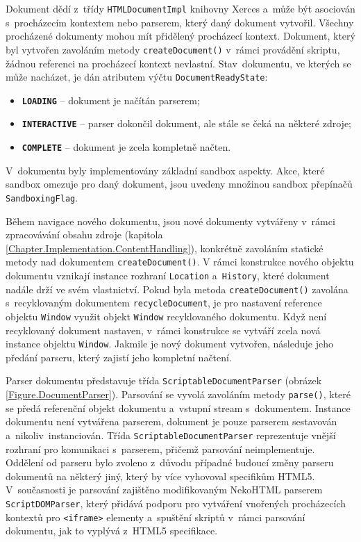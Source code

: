 Dokument dědí z~třídy \texttt{HTMLDocumentImpl} knihovny Xerces a~může být asociován s~procházecím kontextem nebo parserem, který daný dokument vytvořil. Všechny procházené dokumenty mohou mít přidělený procházecí kontext. Dokument, který byl vytvořen zavoláním metody \texttt{createDocument()} v~rámci provádění skriptu, žádnou referenci na procházecí kontext nevlastní. Stav~dokumentu, ve kterých se může nacházet, je dán atributem výčtu \texttt{DocumentReadyState}:

\begin{itemize}
  \item \textbf{\texttt{LOADING}} -- dokument je načítán parserem;
  \item \textbf{\texttt{INTERACTIVE}} -- parser dokončil dokument, ale stále se čeká na některé zdroje;
  \item \textbf{\texttt{COMPLETE}} -- dokument je zcela kompletně načten.
\end{itemize}

V~dokumentu byly implementovány základní sandbox aspekty. Akce, které sandbox omezuje pro daný dokument, jsou uvedeny množinou sandbox přepínačů \texttt{SandboxingFlag}. 

Během navigace nového dokumentu, jsou nové dokumenty vytvářeny v~rámci zpracovávání obsahu zdroje (kapitola \ref{Chapter.Implementation.ContentHandling}), konkrétně zavoláním statické metody nad dokumentem \texttt{createDocument()}. V rámci konstrukce nového objektu dokumentu vznikají instance rozhraní \texttt{Location} a~\texttt{History}, které dokument nadále drží ve svém vlastnictví. Pokud byla metoda \texttt{createDocument()} zavolána s~recyklovaným dokumentem \texttt{recycleDocument}, je pro nastavení reference objektu \texttt{Window} využit objekt \texttt{Window} recyklovaného dokumentu. Když není recyklovaný dokument nastaven, v~rámci konstrukce se vytváří zcela nová instance objektu \texttt{Window}. Jakmile je nový dokument vytvořen, následuje jeho předání parseru, který zajistí jeho kompletní načtení.

Parser dokumentu představuje třída \texttt{ScriptableDocumentParser} (obrázek \ref{Figure.DocumentParser}). Parsování se vyvolá zavoláním metody \texttt{parse()}, které se předá referenční objekt dokumentu a~vstupní stream s~dokumentem. Instance dokumentu není vytvářena parserem, dokument je pouze parserem sestavován a~nikoliv~instanciován. Třída \texttt{ScriptableDocumentParser} reprezentuje vnější rozhraní pro komunikaci s~parserem, přičemž parsování neimplementuje. Oddělení od parseru bylo zvoleno z~důvodu případné budoucí změny parseru dokumentů na některý jiný, který by více vyhovoval specifikům HTML5. V~současnosti je parsování zajištěno modifikovaným NekoHTML parserem \texttt{ScriptDOMParser}, který přidává podporu pro vytváření vnořených procházecích kontextů pro \texttt{<iframe>} elementy a~spuštění skriptů v~rámci parsování dokumentu, jak to vyplývá z~HTML5 specifikace. 

